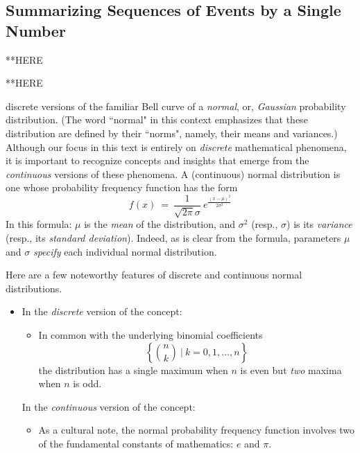 \subsection{Summarizing Sequences of Events by a Single Number}
\label{sec:single-statistic}
 

**HERE


**HERE

  
 

discrete versions of the
familiar Bell curve of a 
{\em normal}, or, {\it Gaussian} probability distribution.  
(The word ``normal" in this context emphasizes that these distribution are defined by their ``norms", namely, 
their means and variances.) Although our focus in this text is entirely on {\em discrete} 
mathematical phenomena, it is important to recognize concepts and insights that 
emerge from the {\em continuous} versions of these phenomena.  A (continuous) normal 
distribution is one whose probability frequency function has the form
\[ f(x) \ = \ \frac{1}{\sqrt{2 \pi} \sigma} \ e^{\frac{(x - \mu)^2}{2 \sigma^2} } \]
In this formula: $\mu$ is the {\it mean} of the distribution, and $\sigma^2$ 
(resp., $\sigma$) is its {\it variance} (resp., its {\it standard deviation}).  Indeed, as is clear
from the formula, parameters $\mu$ and $\sigma$ {\em specify} each individual normal 
distribution.

Here are a few noteworthy features of discrete and continuous normal distributions.
\begin{itemize}
\item
In the {\em discrete} version of the concept:
  \begin{itemize}
  \item
In common with the underlying binomial coefficients
\[ \left\{ {n \choose k} \ | \ k = 0, 1, \ldots, n \right\} \]
the distribution has a single maximum when $n$ is even but {\em two}
maxima when $n$ is odd.

  \end{itemize}

In the {\em continuous} version of the concept:
  \begin{itemize}
  \item
As a cultural note, the normal probability frequency function involves two of the
fundamental constants of mathematics: $e$ and $\pi$.
  \end{itemize}
\end{itemize}

